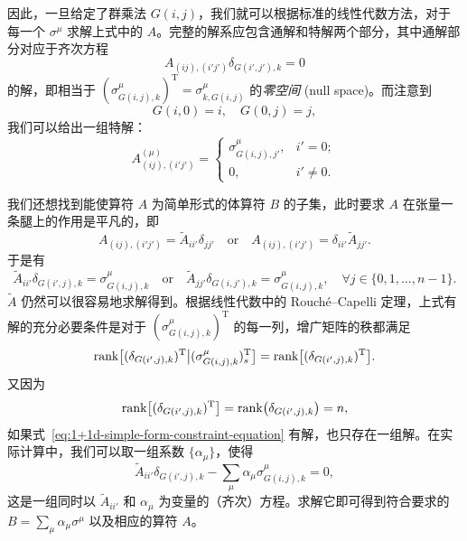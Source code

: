 因此，一旦给定了群乘法 $G(i,j)$，我们就可以根据标准的线性代数方法，对于每一个 $\sigma^\mu$ 求解上式中的 $A$。完整的解系应包含通解和特解两个部分，其中通解部分对应于齐次方程
\begin{equation}
  A_{(ij), (i'j')} \delta_{G(i',j'), k} = 0
\end{equation}
的解，即相当于 $(\sigma^\mu_{G(i,j),k})^{\mathrm{T}}=\sigma^\mu_{k,G(i,j)}$ 的\emph{零空间} (null space)。而注意到
\begin{equation}
  G(i,0) = i, \quad G(0,j) = j,
\end{equation}
我们可以给出一组特解：
\begin{equation}
  A^{(\mu)}_{(ij), (i'j')} = \begin{cases}
    \sigma^\mu_{G(i,j), j'}, & i' = 0; \\
    0, & i' \neq 0.
  \end{cases}
  \label{eq:1+1d-specific-solution}
\end{equation}

我们还想找到能使算符 $A$ 为简单形式的体算符 $B$ 的子集，此时要求 $A$ 在张量一条腿上的作用是平凡的，即
\begin{equation}
  A_{(ij), (i'j')} = \tilde{A}_{ii'} \delta_{jj'} \quad \text{or} \quad
  A_{(ij), (i'j')} = \delta_{ii'} \tilde{A}_{jj'}.
\end{equation}
于是有
\begin{equation}
  \tilde{A}_{ii'} \delta_{G(i',j), k} = \sigma^\mu_{G(i,j), k} \quad \text{or} \quad
  \tilde{A}_{jj'} \delta_{G(i,j'), k} = \sigma^\mu_{G(i,j), k}, \quad
  \forall j \in \{ 0, 1, \dots, n-1 \}.
  \label{eq:1+1d-simple-form-constraint-equation}
\end{equation}
$\tilde{A}$ 仍然可以很容易地求解得到。根据线性代数中的 Rouch\'e--Capelli 定理，上式有解的充分必要条件是对于 $(\sigma^\mu_{G(i,j),k})^{\mathrm{T}}$ 的每一列，增广矩阵的秩都满足
\begin{equation}
    \operatorname{rank}\bigl[ (\delta_{G(i',j), k})^{\mathrm{T}} \big| (\sigma^\mu_{G(i,j),k})^{\mathrm{T}}_s \bigr]
  = \operatorname{rank}\bigl[ (\delta_{G(i',j), k})^{\mathrm{T}} \bigr].
\end{equation}
又因为
\begin{equation}
    \operatorname{rank}\bigl[ (\delta_{G(i',j), k})^{\mathrm{T}} \bigr]
  = \operatorname{rank}\bigl( \delta_{G(i',j), k} \bigr) = n,
\end{equation}
如果式~\eqref{eq:1+1d-simple-form-constraint-equation} 有解，也只存在一组解。在实际计算中，我们可以取一组系数 $\{\alpha_\mu\}$，使得
\begin{equation}
  \tilde{A}_{ii'} \delta_{G(i',j), k} - \sum_\mu \alpha_\mu \sigma^\mu_{G(i,j), k} = 0,
  \label{eq:1+1d-simple-form-augmented-constraint-equation}
\end{equation}
这是一组同时以 $\tilde{A}_{ii'}$ 和 $\alpha_\mu$ 为变量的（齐次）方程。求解它即可得到符合要求的 $B=\sum_\mu\alpha_\mu\sigma^\mu$ 以及相应的算符 $A$。

